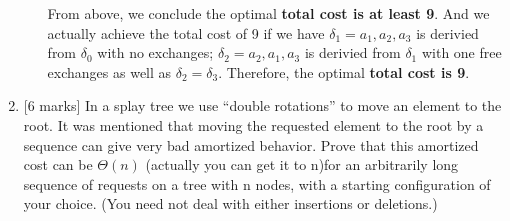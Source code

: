 \documentclass[12pt]{article}
\begin{document}
\begin{enumerate}
\begin{itemize}
From above, we conclude the optimal \textbf{total cost is at least 9}.  And we actually achieve the total cost of 9 if we have $\delta_{1} = a_{1},a_{2},a_{3}$ is derivied from $\delta_{0}$ with no exchanges;  $\delta_{2} = a_{2},a_{1},a_{3}$ is derivied from $\delta_{1}$ with one free exchanges as well as $\delta_{2} = \delta_{3}$. Therefore, the optimal \textbf{total cost is 9}.

\end{itemize}

\medskip

\item{} [6 marks]
In a splay tree we use “double rotations” to move an element to the root. It was mentioned that moving the requested element to the root by a sequence can give very bad amortized behavior. Prove that this amortized cost can be $\Theta(n)$ (actually you can get it to n)for an arbitrarily long sequence of requests on a tree with n nodes, with a starting configuration of your choice. (You need not deal with either insertions or deletions.)

\end{enumerate}
\end{document}
